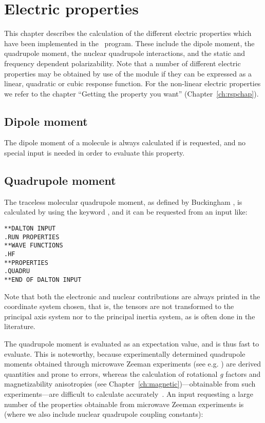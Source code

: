 \chapter{Electric properties}\label{ch:electric}

This chapter describes the calculation of the different electric
properties which have been implemented in the \dalton\ program.
These include the dipole moment, the quadrupole
moment, the nuclear quadrupole
interactions, and the static and frequency dependent
polarizability. Note that a number of different electric
properties may be
obtained by use of the {\resp} module if they can be expressed as a
linear, quadratic or cubic response function. For the non-linear
electric properties we refer to the chapter ``Getting the property you
want'' (Chapter~\ref{ch:rspchap}).

\section{Dipole moment}\label{sec:dipmom}

The dipole moment of a  molecule is always
calculated if  is
requested, and no special input is needed in order to evaluate this property.

\section{Quadrupole moment}\label{sec:quadmom}

The traceless molecular quadrupole moment, as
defined by Buckingham
\cite{adbacp12}, is calculated by using the keyword , and
it can be requested from an input like:

\begin{verbatim}
**DALTON INPUT
.RUN PROPERTIES
**WAVE FUNCTIONS
.HF
**PROPERTIES
.QUADRU
**END OF DALTON INPUT
\end{verbatim}

Note that both the electronic and nuclear contributions are always
printed in the coordinate system chosen, that is, the tensors are not
transformed to the principal axis system nor to the principal inertia
system, as is often done in the literature.

The quadrupole moment is evaluated as an expectation value, and is
thus fast to evaluate. This is noteworthy, because experimentally
determined quadrupole moments obtained through microwave Zeeman experiments
(see e.g.  \cite{whmklwhfjcp48,jsdhszna46}) are derived
quantities and prone to errors,
whereas the calculation of rotational {\em g} factors and magnetizability
anisotropies (see Chapter~\ref{ch:magnetic})---obtainable from such
experiments---are difficult to calculate accurately~\cite{krthcpl264}. An input
requesting a large number of the properties obtainable from microwave
Zeeman experiments is (where we also include nuclear quadrupole
coupling constants):

